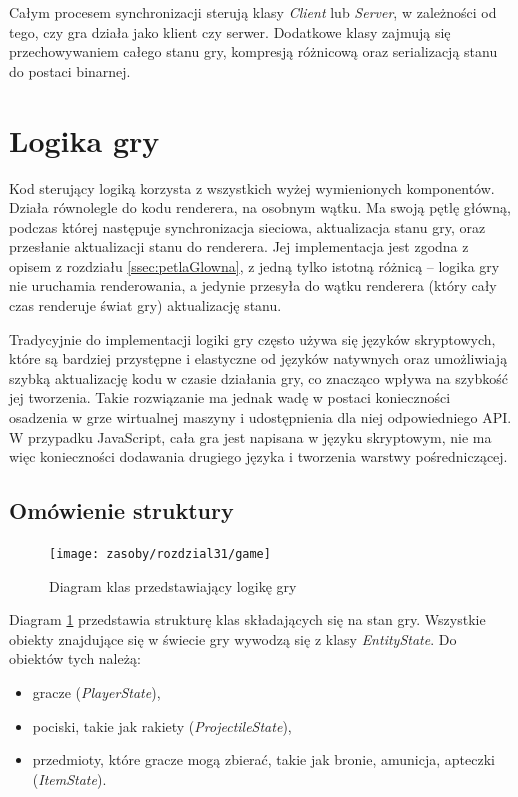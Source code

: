 Całym procesem synchronizacji sterują klasy \emph{Client} lub \emph{Server}, w zależności od tego, czy
gra działa jako klient czy serwer. Dodatkowe klasy zajmują się przechowywaniem całego stanu gry, kompresją
różnicową oraz serializacją stanu do postaci binarnej.

\section{Logika gry}
\label{sec:logikaGry}

Kod sterujący logiką korzysta z wszystkich wyżej wymienionych komponentów. Działa równolegle do kodu renderera,
na osobnym wątku. Ma swoją pętlę główną, podczas której następuje synchronizacja sieciowa, aktualizacja stanu gry,
oraz przesłanie aktualizacji stanu do renderera. Jej implementacja jest zgodna z opisem z rozdziału
\ref{ssec:petlaGlowna}, z jedną tylko istotną różnicą -- logika gry nie uruchamia renderowania, a jedynie
przesyła do wątku renderera (który cały czas renderuje świat gry) aktualizację stanu.

Tradycyjnie do implementacji logiki gry często używa się języków skryptowych, które są bardziej przystępne 
i elastyczne od języków natywnych oraz umożliwiają szybką aktualizację kodu w czasie działania gry, co znacząco
wpływa na szybkość jej tworzenia. Takie rozwiązanie ma jednak wadę w postaci konieczności osadzenia
w grze wirtualnej maszyny i udostępnienia dla niej odpowiedniego API. W przypadku JavaScript, cała
gra jest napisana w języku skryptowym, nie ma więc konieczności dodawania drugiego języka i tworzenia
warstwy pośredniczącej.

\subsection{Omówienie struktury}
\begin{figure}[h]
  \centering
  \texttt{[image: zasoby/rozdzial31/game]}  
  \caption{Diagram klas przedstawiający logikę gry}
  \label{fig:gameClasses}
\end{figure}

Diagram \ref{fig:gameClasses} przedstawia strukturę klas składających się na stan gry. Wszystkie obiekty
znajdujące się w świecie gry wywodzą się z klasy \emph{EntityState}. Do obiektów tych należą:
\begin{itemize}
\item gracze (\emph{PlayerState}),
\item pociski, takie jak rakiety (\emph{ProjectileState}),
\item przedmioty, które gracze mogą zbierać, takie jak bronie, amunicja, apteczki (\emph{ItemState}).
\end{itemize}

